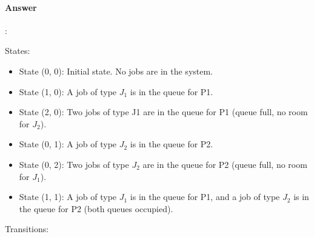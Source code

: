 \documentclass{article}
\begin{document}
\paragraph{Answer}:


States:

\begin{itemize}
  \item State (0, 0): Initial state. No jobs are in the system.
  \item State (1, 0): A job of type $J_1$ is in the queue for P1.
  \item State (2, 0): Two jobs of type J1 are in the queue for P1 (queue full, no room for $J_2$).
  \item State (0, 1): A job of type $J_2$ is in the queue for P2.
  \item State (0, 2): Two jobs of type $J_2$ are in the queue for P2 (queue full, no room for $J_1$).
  \item State (1, 1): A job of type $J_1$ is in the queue for P1, and a job of type $J_2$ is in the queue for P2 (both queues occupied).
\end{itemize}

Transitions:
\end{document}
